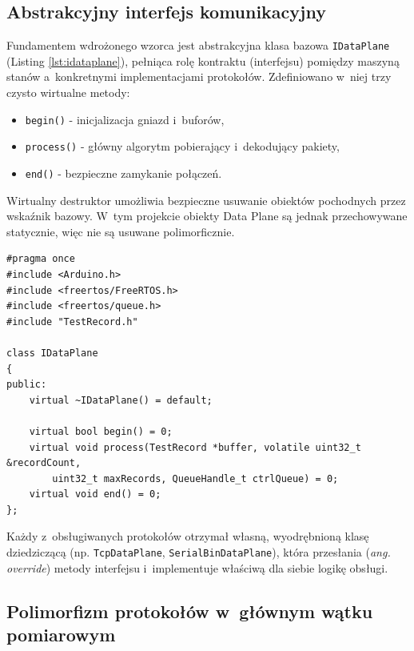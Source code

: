 \subsection{Abstrakcyjny interfejs komunikacyjny}
\label{sec:abstrakcyjny_interfejs_komunikacyjny}

Fundamentem wdrożonego wzorca jest abstrakcyjna klasa bazowa \texttt{IDataPlane} (Listing \ref{lst:idataplane}), pełniąca rolę kontraktu (interfejsu) pomiędzy maszyną stanów a~konkretnymi implementacjami protokołów.
Zdefiniowano w~niej trzy czysto wirtualne metody:
\begin{itemize}
    \item \texttt{begin()} - inicjalizacja gniazd i~buforów,
    \item \texttt{process()} - główny algorytm pobierający i~dekodujący pakiety,
    \item \texttt{end()} - bezpieczne zamykanie połączeń.
\end{itemize}

Wirtualny destruktor umożliwia bezpieczne usuwanie obiektów pochodnych przez wskaźnik bazowy. W~tym projekcie obiekty Data Plane są jednak przechowywane statycznie, więc nie są usuwane polimorficznie.

\begin{listing}[htbp]
    \caption{Definicja abstrakcyjnego interfejsu warstwy danych określającego kontrakt (\texttt{IDataPlane.h}) \cite{espy_nexus_esp32_firmware}.}
    \label{lst:idataplane}
    \begin{verbatim}
#pragma once
#include <Arduino.h>
#include <freertos/FreeRTOS.h>
#include <freertos/queue.h>
#include "TestRecord.h"

class IDataPlane
{
public:
    virtual ~IDataPlane() = default;

    virtual bool begin() = 0;
    virtual void process(TestRecord *buffer, volatile uint32_t &recordCount, 
        uint32_t maxRecords, QueueHandle_t ctrlQueue) = 0;
    virtual void end() = 0;
};
\end{verbatim}
\end{listing}

Każdy z~obsługiwanych protokołów otrzymał własną, wyodrębnioną klasę dziedziczącą (np. \texttt{TcpDataPlane}, \texttt{SerialBinDataPlane}), która przesłania (\textit{ang. override}) metody interfejsu i~implementuje właściwą dla siebie logikę obsługi.

\subsection{Polimorfizm protokołów w~głównym wątku pomiarowym}
\label{sec:polimorfizm_proces}

